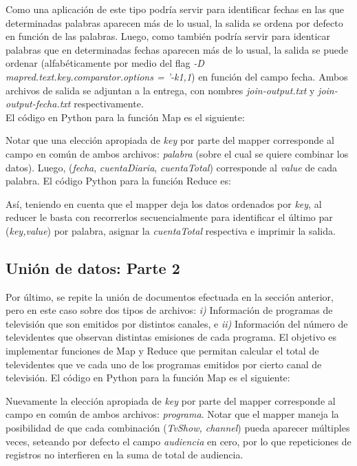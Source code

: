 \documentclass[letterpaper, 10 pt, conference]{ieeeconf}  %
\begin{document}
Como una aplicación de este tipo podría servir para identificar fechas en las que determinadas palabras aparecen más de lo usual, la salida se ordena por defecto en función de las palabras. Luego, como también podría servir para identicar palabras que en determinadas fechas aparecen más de lo usual, la salida se puede ordenar (alfabéticamente por medio del flag \textit{-D mapred.text.key.comparator.options = '-k1,1}) en función del campo fecha. Ambos archivos de salida se adjuntan a la entrega, con nombres \textit{join-output.txt} y \textit{join-output-fecha.txt} respectivamente.  
\\

\noindent El código en Python para la función Map es el siguiente:



\noindent Notar que una elección apropiada de \textit{key} por parte del mapper corresponde  al campo en común de ambos archivos: \textit{palabra} (sobre el cual se quiere combinar los datos). Luego, (\textit{fecha}, \textit{cuentaDiaria}, \textit{cuentaTotal}) corresponde al \textit{value} de cada palabra. El código Python para la función Reduce es:



\noindent Así, teniendo en cuenta que el mapper deja los datos ordenados por \textit{key}, al reducer le basta con recorrerlos secuencialmente para identificar el último par (\textit{key,value}) por palabra, asignar la \textit{cuentaTotal} respectiva e imprimir la salida. 

\subsection{Unión de datos: Parte 2}
Por último, se repite la unión de documentos efectuada en la sección anterior, pero en este caso sobre dos tipos de archivos: \textit{i)} Información de programas de televisión que son emitidos por distintos canales, e \textit{ii)} Información del número de televidentes que observan distintas emisiones de cada programa. El objetivo es implementar funciones de Map y Reduce que permitan calcular el total de televidentes que ve cada uno de los programas emitidos por cierto canal de televisión. El código en Python para la función Map es el siguiente:



\noindent Nuevamente la elección apropiada de \textit{key} por parte del mapper corresponde  al campo en común de ambos archivos: \textit{programa}. Notar que el mapper maneja la posibilidad de que cada combinación (\textit{TvShow, channel}) pueda aparecer múltiples veces, seteando por defecto el campo \textit{audiencia} en cero, por lo que repeticiones de registros no interfieren en la suma de total de audiencia.  
\end{document}
